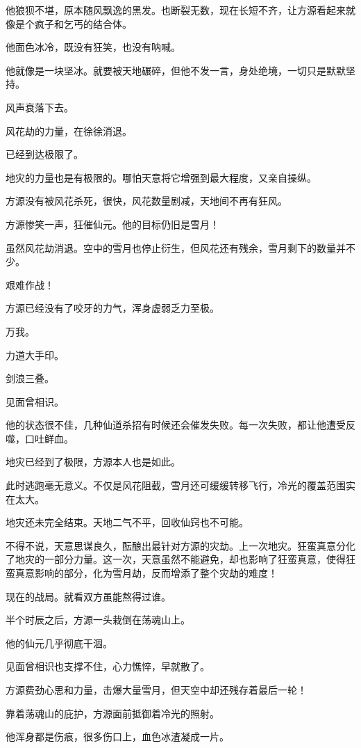 \begin{this_body}
他狼狈不堪，原本随风飘逸的黑发。也断裂无数，现在长短不齐，让方源看起来就像是个疯子和乞丐的结合体。

他面色冰冷，既没有狂笑，也没有呐喊。

他就像是一块坚冰。就要被天地碾碎，但他不发一言，身处绝境，一切只是默默坚持。

风声衰落下去。

风花劫的力量，在徐徐消退。

已经到达极限了。

地灾的力量也是有极限的。哪怕天意将它增强到最大程度，又亲自操纵。

方源没有被风花杀死，很快，风花数量剧减，天地间不再有狂风。

方源惨笑一声，狂催仙元。他的目标仍旧是雪月！

虽然风花劫消退。空中的雪月也停止衍生，但风花还有残余，雪月剩下的数量并不少。

艰难作战！

方源已经没有了咬牙的力气，浑身虚弱乏力至极。

万我。

力道大手印。

剑浪三叠。

见面曾相识。

他的状态很不佳，几种仙道杀招有时候还会催发失败。每一次失败，都让他遭受反噬，口吐鲜血。

地灾已经到了极限，方源本人也是如此。

此时逃跑毫无意义。不仅是风花阻截，雪月还可缓缓转移飞行，冷光的覆盖范围实在太大。

地灾还未完全结束。天地二气不平，回收仙窍也不可能。

不得不说，天意思谋良久，酝酿出最针对方源的灾劫。上一次地灾。狂蛮真意分化了地灾的一部分力量。这一次，天意虽然不能避免，却也影响了狂蛮真意，使得狂蛮真意影响的部分，化为雪月劫，反而增添了整个灾劫的难度！

现在的战局。就看双方虽能熬得过谁。

半个时辰之后，方源一头栽倒在荡魂山上。

他的仙元几乎彻底干涸。

见面曾相识也支撑不住，心力憔悴，早就散了。

方源费劲心思和力量，击爆大量雪月，但天空中却还残存着最后一轮！

靠着荡魂山的庇护，方源面前抵御着冷光的照射。

他浑身都是伤痕，很多伤口上，血色冰渣凝成一片。


\end{this_body}
